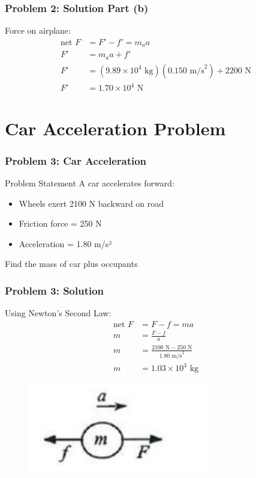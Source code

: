 \documentclass{beamer}
\begin{document}
\begin{frame}
\frametitle{Problem 2: Solution Part (b)}
Force on airplane:
\begin{align*}
\text{net }F &= F' - f' = m_aa\\
F' &= m_aa + f'\\
F' &= (9.89 \times 10^4\text{ kg})(0.150\text{ m/s}^2) + 2200\text{ N}\\
F' &= 1.70 \times 10^4\text{ N}
\end{align*}\end{frame}



\section{Car Acceleration Problem}

\begin{frame}
\frametitle{Problem 3: Car Acceleration}
\begin{block}{Problem Statement}
A car accelerates forward:
\begin{itemize}
    \item Wheels exert 2100 N backward on road
    \item Friction force = 250 N
    \item Acceleration = 1.80 m/s²
\end{itemize}
Find the mass of car plus occupants
\end{block}
\end{frame}

\begin{frame}
\frametitle{Problem 3: Solution}
Using Newton's Second Law:
\begin{align*}
\text{net }F &= F - f = ma\\
m &= \frac{F-f}{a}\\
m &= \frac{2100\text{ N} - 250\text{ N}}{1.80\text{ m/s}^2}\\
m &= 1.03 \times 10^3\text{ kg}
\end{align*}
\begin{figure}[H]
    \centering
    \includegraphics[width=0.5\linewidth]{CH9.5 4,5,9 Review/Screenshot 2024-11-12 092952.png}
\end{figure}

\end{frame}
\end{document}
